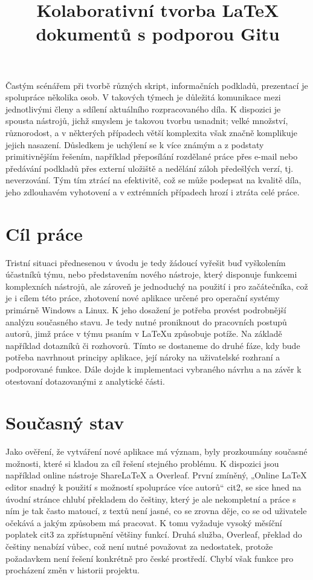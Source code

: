 \documentclass[thesis=B,czech]{FITthesis}[2012/06/26]
\title{Kolaborativní tvorba LaTeX dokumentů s podporou Gitu}
\begin{document}

\begin{introduction}
	Častým scénářem při tvorbě různých skript, informačních podkladů, prezentací je spolupráce několika osob. V takových týmech je důležitá komunikace mezi jednotlivými členy a sdílení aktuálního rozpracovaného díla. K dispozici je spousta nástrojů, jichž smyslem je takovou tvorbu usnadnit; velké množství, různorodost, a v některých případech větší komplexita však značně komplikuje jejich nasazení. Důsledkem je uchýlení se k více známým a z podstaty primitivnějším řešením, například přeposílání rozdělané práce přes e-mail nebo předávání podkladů přes externí uložiště a nedělání záloh předešlých verzí, tj. neverzování. Tým tím ztrácí na efektivitě, což se může podepsat na kvalitě díla, jeho zdlouhavém vyhotovení a v extrémních případech hrozí i ztráta celé práce.
\end{introduction}

\chapter{Cíl práce}
Tristní situaci přednesenou v úvodu je tedy žádoucí vyřešit buď vyškolením účastníků týmu, nebo představením nového nástroje, který disponuje funkcemi komplexních nástrojů, ale zároveň je jednoduchý na použití i pro začátečníka, což je i cílem této práce, zhotovení nové aplikace určené pro operační systémy primárně Windows a Linux. K jeho dosažení je potřeba provést podrobnější analýzu současného stavu. Je tedy nutné proniknout do pracovních postupů autorů, jimž práce v týmu psaním v LaTeXu způsobuje potíže. Na základě například dotazníků či rozhovorů. Tímto se dostaneme do druhé fáze, kdy bude potřeba navrhnout principy aplikace, její nároky na uživatelské rozhraní a podporované funkce. Dále dojde k implementaci vybraného návrhu a na závěr k otestovaní dotazovanými z analytické části.

\chapter{Současný stav}
Jako ověření, že vytváření nové aplikace má význam, byly prozkoumány současné možnosti, které si kladou za cíl řešení stejného problému. K dispozici jsou například online nástroje ShareLaTeX a Overleaf. První zmíněný, „Online LaTeX editor snadný k použití s možností spolupráce více autorů“ {cit2}, se sice hned na úvodní stránce chlubí překladem do češtiny, který je ale nekompletní a práce s ním je tak často matoucí, z textů není jasné, co se zrovna děje, co se od uživatele očekává a jakým způsobem má pracovat. K tomu vyžaduje vysoký měsíční poplatek {cit3} za zpřístupnění většiny funkcí. Druhá služba, Overleaf, překlad do češtiny nenabízí vůbec, což není nutné považovat za nedostatek, protože požadavkem není řešení konkrétně pro české prostředí. Chybí však funkce pro procházení změn v historii projektu.
\end{document}
